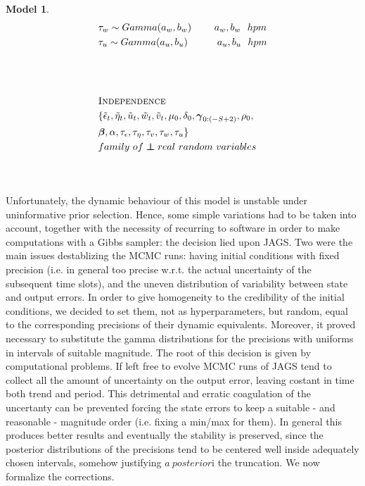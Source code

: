 \documentclass[11pt,twoside]{report}
\newcommand\independent{\protect\mathpalette{\protect\independenT}{\perp}}
\def\independenT#1#2{\mathrel{\rlap{$#1#2$}\mkern2mu{#1#2}}}
\newtheorem{model}{Model}
\begin{document}
\begin{model}
\begin{equation*}
\begin{aligned}[c]
&\tau_w\sim Gamma(a_w, b_w)\quad\quad\ a_w, b_w\ \ hpm\\
&\tau_u \sim Gamma(a_u, b_u)\quad\quad\quad a_u, b_u\ \ hpm\\
&\\
&\\
&\\
&\textsc{Independence}\\
&\{\tilde{\epsilon}_t, \tilde{\eta}_t, \tilde{u}_t, \tilde{w}_t, \tilde{v}_t, \mu_0, \delta_0, \boldsymbol{\gamma}_{0:(-S+2)}, \rho_0,\\ &\boldsymbol{\beta}, \alpha, \tau_\epsilon, \tau_\eta, \tau_v, \tau_w, \tau_u\}\\ &family\ of \independent real\ random\ variables\\
&\\
&\\
 \end{aligned}
\end{equation*}
\end{model}


Unfortunately, the dynamic behaviour of this model is unstable under uninformative prior selection. Hence, some simple variations had to be taken into account, together with the necessity of recurring to software in order to make computations with a Gibbs sampler: the decision lied upon JAGS. Two were the main issues destablizing the MCMC runs: having initial conditions with fixed precision (i.e. in general too precise w.r.t. the actual uncertainty of the subsequent time slots), and the uneven distribution of variability between state and output errors. In order to give homogeneity to the credibility of the initial conditions, we decided to set them, not as hyperparameters, but random, equal to the corresponding precisions of their dynamic equivalents. Moreover, it proved necessary to substitute the gamma distributions for the precisions with uniforms in intervals of suitable magnitude. The root of this decision is given by computational problems. If left free to evolve MCMC runs of JAGS tend to collect all the amount of uncertainty on the output error, leaving costant in time both trend and period. This detrimental and erratic coagulation of the uncertanty can be prevented forcing the state errors to keep a suitable - and reasonable - magnitude order (i.e. fixing a min/max for them). In general this produces better results and eventually the stability is preserved, since the posterior distributions of the precisions tend to be centered well inside adequately chosen intervals, somehow justifying $ a\ posterior $i the truncation. We now formalize the corrections.
\end{document}

